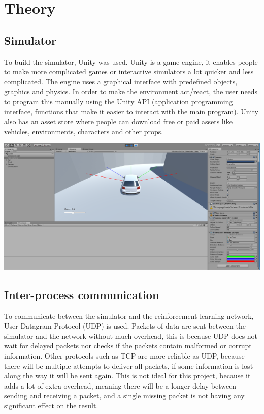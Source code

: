 \documentclass{article}
\begin{document}
\section{Theory}
\subsection{Simulator}
To build the simulator, Unity was used. Unity is a game engine, it enables people to make more complicated games or interactive simulators a lot quicker and less complicated. The engine uses a graphical interface with predefined objects, graphics and physics. In order to make the environment act/react, the user needs to program this manually using the Unity API (application programming interface, functions that make it easier to interact with the main program). Unity also has an asset store where people can download free or paid assets like vehicles, environments, characters and other props. 

\includegraphics[width=\paperwidth]{simulator_env}

\subsection{Inter-process communication}
To communicate between the simulator and the reinforcement learning network, User Datagram Protocol (UDP) is used. Packets of data are sent between the simulator and the network without much overhead, this is because UDP does not wait for delayed packets nor checks if the packets contain malformed or corrupt information. Other protocols such as TCP are more reliable as UDP, because there will be multiple attempts to deliver all packets, if some information is lost along the way it will be sent again. This is not ideal for this project, because it adds a lot of extra overhead, meaning there will be a longer delay between sending and receiving a packet, and a single missing packet is not having any significant effect on the result.
\end{document}
